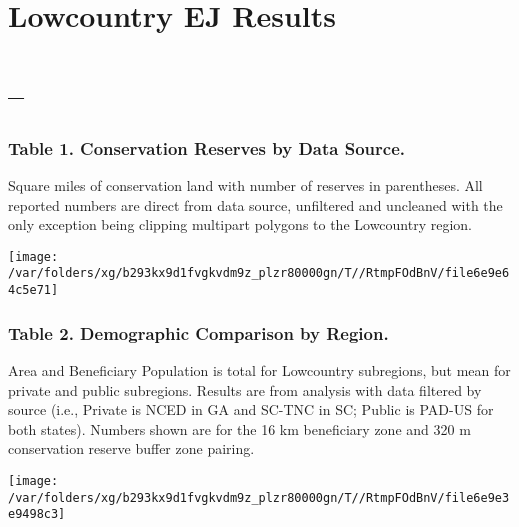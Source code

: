 \documentclass[landscape]{article}
\author{}
\date{\vspace{-2.5em}}
\begin{document}
\hypertarget{lowcountry-ej-results}{%
\section{Lowcountry EJ Results}\label{lowcountry-ej-results}}

\hypertarget{section}{%
\section{--}\label{section}}

\hypertarget{table-1.-conservation-reserves-by-data-source.}{%
\subsubsection{Table 1. Conservation Reserves by Data
Source.}\label{table-1.-conservation-reserves-by-data-source.}}

Square miles of conservation land with number of reserves in
parentheses. All reported numbers are direct from data source,
unfiltered and uncleaned with the only exception being clipping
multipart polygons to the Lowcountry region.

\texttt{[image: /var/folders/xg/b293kx9d1fvgkvdm9z\_plzr80000gn/T//RtmpFOdBnV/file6e9e64c5e71]}

\hypertarget{table-2.-demographic-comparison-by-region.}{%
\subsubsection{Table 2. Demographic Comparison by
Region.}\label{table-2.-demographic-comparison-by-region.}}

Area and Beneficiary Population is total for Lowcountry subregions, but
mean for private and public subregions. Results are from analysis with
data filtered by source (i.e., Private is NCED in GA and SC-TNC in SC;
Public is PAD-US for both states). Numbers shown are for the 16 km
beneficiary zone and 320 m conservation reserve buffer zone pairing.

\texttt{[image: /var/folders/xg/b293kx9d1fvgkvdm9z\_plzr80000gn/T//RtmpFOdBnV/file6e9e3e9498c3]}
\end{document}
